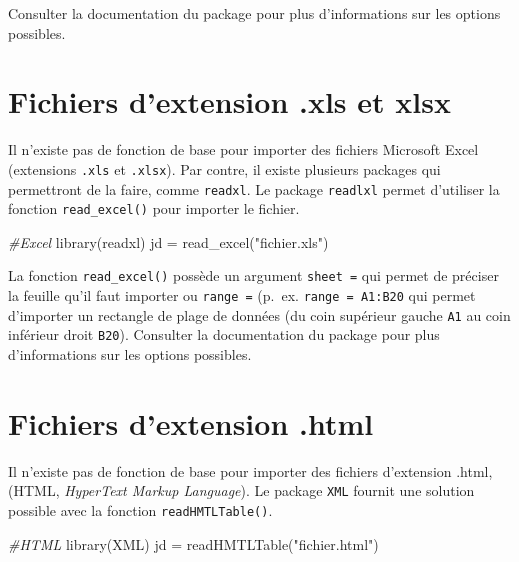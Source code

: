 \documentclass[
]{book}
\newenvironment{Shaded}{}{}
\newcommand{\CommentTok}[1]{\textit{#1}}
\newcommand{\FunctionTok}[1]{#1}
\newcommand{\NormalTok}[1]{#1}
\newcommand{\OtherTok}[1]{#1}
\newcommand{\StringTok}[1]{#1}
\begin{document}
Consulter la documentation du package pour plus d'informations sur les options possibles.

\hypertarget{fichiers-dextension-.xls-et-xlsx}{%
\section{Fichiers d'extension .xls et xlsx}\label{fichiers-dextension-.xls-et-xlsx}}

Il n'existe pas de fonction de base pour importer des fichiers Microsoft Excel (extensions \texttt{.xls} et \texttt{.xlsx}). Par contre, il existe plusieurs packages qui permettront de la faire, comme \texttt{readxl}. Le package \texttt{readlxl} permet d'utiliser la fonction \texttt{read\_excel()} pour importer le fichier.

\begin{Shaded}
\begin{Highlighting}[]
\CommentTok{\#Excel}
\FunctionTok{library}\NormalTok{(readxl)}
\NormalTok{jd }\OtherTok{=} \FunctionTok{read\_excel}\NormalTok{(}\StringTok{"fichier.xls"}\NormalTok{)}
\end{Highlighting}
\end{Shaded}

La fonction \texttt{read\_excel()} possède un argument \texttt{sheet\ =} qui permet de préciser la feuille qu'il faut importer ou \texttt{range\ =} (p.~ex. \texttt{range\ =\ A1:B20} qui permet d'importer un rectangle de plage de données (du coin supérieur gauche \texttt{A1} au coin inférieur droit \texttt{B20}).
Consulter la documentation du package pour plus d'informations sur les options possibles.

\hypertarget{fichiers-dextension-.html}{%
\section{Fichiers d'extension .html}\label{fichiers-dextension-.html}}

Il n'existe pas de fonction de base pour importer des fichiers d'extension .html, (HTML, \emph{HyperText Markup Language}). Le package \texttt{XML} fournit une solution possible avec la fonction \texttt{readHMTLTable()}.

\begin{Shaded}
\begin{Highlighting}[]
\CommentTok{\#HTML}
\FunctionTok{library}\NormalTok{(XML)}
\NormalTok{jd }\OtherTok{=} \FunctionTok{readHMTLTable}\NormalTok{(}\StringTok{"fichier.html"}\NormalTok{)}
\end{Highlighting}
\end{Shaded}
\end{document}
